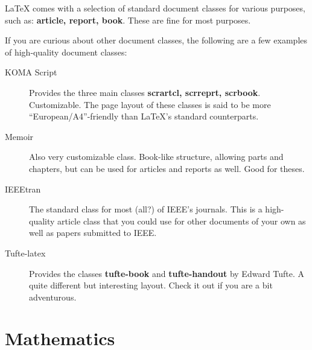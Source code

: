 \documentclass[english]{beamer}
\begin{document}

\begin{frame}[allowframebreaks]{\insertsection}
  \LaTeX{} comes with a selection of standard document classes for
  various purposes, such as: {\bfseries article, report, book}. These
  are fine for most purposes.

  If you are curious about other document classes, the following are a
  few examples of high-quality document classes:
  \begin{description}
  \item[KOMA Script] Provides the three main classes {\bfseries
      scrartcl, scrreprt, scrbook}. Customizable. The page layout of
    these classes is said to be more ``European/A4''-friendly than
    \LaTeX's standard counterparts.
  \item[Memoir] Also very customizable class. Book-like structure,
    allowing parts and chapters, but can be used for articles and
    reports as well. Good for theses.
  \item[IEEEtran] The standard class for most (all?) of IEEE's
    journals. This is a high-quality article class that you could use
    for other documents of your own as well as papers submitted to
    IEEE.
  \item[Tufte-latex] Provides the classes \textbf{tufte-book} and
    \textbf{tufte-handout} by Edward Tufte. A quite different but
    interesting layout. Check it out if you are a bit adventurous.
  \end{description}
\end{frame}


\section{Mathematics}
\end{document}
